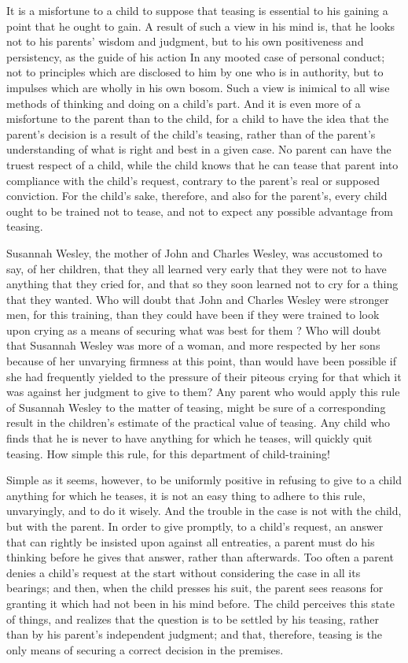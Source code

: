 \documentclass[
]{book}
\begin{document}
It is a misfortune to a child to suppose that teasing is essential to his gaining a point that he ought to gain. A result of such a view in his mind is, that he looks not to his parents' wisdom and judgment, but to his own positiveness and persistency, as the guide of his action In any mooted case of personal conduct; not to principles which are disclosed to him by one who is in authority, but to impulses which are wholly in his own bosom. Such a view is inimical to all wise methods of thinking and doing on a child's part. And it is even more of a misfortune to the parent than to the child, for a child to have the idea that the parent's decision is a result of the child's teasing, rather than of the parent's understanding of what is right and best in a given case. No parent can have the truest respect of a child, while the child knows that he can tease that parent into compliance with the child's request, contrary to the parent's real or supposed conviction. For the child's sake, therefore, and also for the parent's, every child ought to be trained not to tease, and not to expect any possible advantage from teasing.

Susannah Wesley, the mother of John and Charles Wesley, was accustomed to say, of her children, that they all learned very early that they were not to have anything that they cried for, and that so they soon learned not to cry for a thing that they wanted. Who will doubt that John and Charles Wesley were stronger men, for this training, than they could have been if they were trained to look upon crying as a means of securing what was best for them ? Who will doubt that Susannah Wesley was more of a woman, and more respected by her sons because of her unvarying firmness at this point, than would have been possible if she had frequently yielded to the pressure of their piteous crying for that which it was against her judgment to give to them? Any parent who would apply this rule of Susannah Wesley to the matter of teasing, might be sure of a corresponding result in the children's estimate of the practical value of teasing. Any child who finds that he is never to have anything for which he teases, will quickly quit teasing. How simple this rule, for this department of child-training!

Simple as it seems, however, to be uniformly positive in refusing to give to a child anything for which he teases, it is not an easy thing to adhere to this rule, unvaryingly, and to do it wisely. And the trouble in the case is not with the child, but with the parent. In order to give promptly, to a child's request, an answer that can rightly be insisted upon against all entreaties, a parent must do his thinking before he gives that answer, rather than afterwards. Too often a parent denies a child's request at the start without considering the case in all its bearings; and then, when the child presses his suit, the parent sees reasons for granting it which had not been in his mind before. The child perceives this state of things, and realizes that the question is to be settled by his teasing, rather than by his parent's independent judgment; and that, therefore, teasing is the only means of securing a correct decision in the premises.
\end{document}
